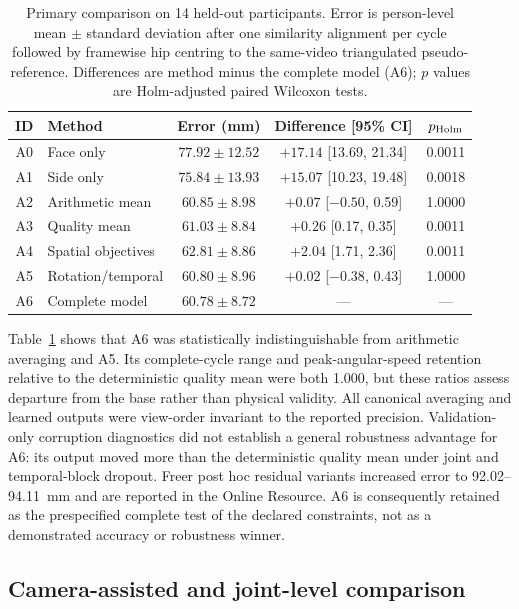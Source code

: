 \documentclass[lineno,pdflatex,sn-mathphys-num]{sn-jnl}
\begin{document}
\begin{table}[t]
\caption{Primary comparison on 14 held-out participants. Error is
person-level mean $\pm$ standard deviation after one similarity alignment per
cycle followed by framewise hip centring to the same-video triangulated
pseudo-reference. Differences are
method minus the complete model (A6); $p$ values are Holm-adjusted paired
Wilcoxon tests.}
\label{tab:heldout}
\centering
\scriptsize
\begin{tabular}{clccc}
\toprule
ID & Method & Error (mm) & Difference [95\% CI] & $p_{\rm Holm}$\\
\midrule
A0 & Face only & $77.92\pm12.52$ & $+17.14$ [13.69, 21.34] & 0.0011\\
A1 & Side only & $75.84\pm13.93$ & $+15.07$ [10.23, 19.48] & 0.0018\\
A2 & Arithmetic mean & $60.85\pm8.98$ & $+0.07$ [$-0.50$, 0.59] & 1.0000\\
A3 & Quality mean & $61.03\pm8.84$ & $+0.26$ [0.17, 0.35] & 0.0011\\
A4 & Spatial objectives & $62.81\pm8.86$ & $+2.04$ [1.71, 2.36] & 0.0011\\
A5 & Rotation/temporal & $60.80\pm8.96$ & $+0.02$ [$-0.38$, 0.43] & 1.0000\\
A6 & Complete model & $\mathbf{60.78\pm8.72}$ & --- & ---\\
\bottomrule
\end{tabular}
\end{table}

Table~\ref{tab:heldout} shows that A6 was statistically indistinguishable from
arithmetic averaging and A5. Its complete-cycle range and peak-angular-speed
retention relative to the deterministic quality mean were both 1.000, but
these ratios assess departure from the base rather than physical validity.
All canonical averaging and learned outputs were view-order invariant to the
reported precision. Validation-only corruption diagnostics did not establish a
general robustness advantage for A6: its output moved more than the
deterministic quality mean under joint and temporal-block dropout. Freer post
hoc residual variants increased error to 92.02--94.11~mm and are reported in
the Online Resource. A6 is consequently retained as the prespecified complete
test of the declared constraints, not as a demonstrated accuracy or robustness
winner.

\subsection{Camera-assisted and joint-level comparison}
\end{document}
